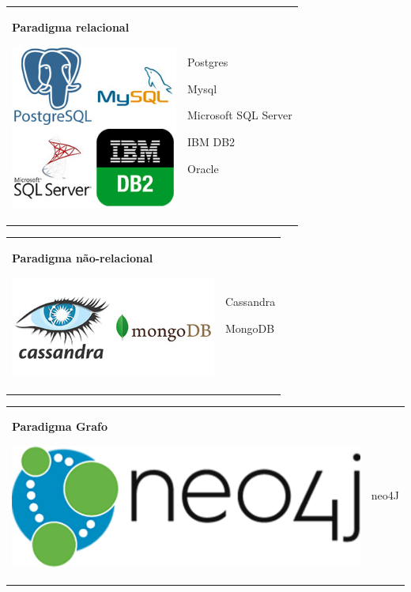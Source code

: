 \documentclass[
]{book}
\begin{document}
\begin{longtable}[]{@{}
  >{\raggedright\arraybackslash}p{}
  >{\centering\arraybackslash}p{}@{}}
\toprule\noalign{}
\endhead
\bottomrule\noalign{}
\endlastfoot
\textbf{Paradigma relacional}

\includegraphics[width=2.16667in,height=\textheight]{images/clipboard-3269919173.png} & Postgres

Mysql

Microsoft SQL Server

IBM DB2

Oracle \\
\end{longtable}

\begin{longtable}[]{@{}
  >{\raggedright\arraybackslash}p{}
  >{\centering\arraybackslash}p{}@{}}
\toprule\noalign{}
\endhead
\bottomrule\noalign{}
\endlastfoot
\textbf{Paradigma não-relacional}

\includegraphics{images/clipboard-1618144074.png} & Cassandra

MongoDB \\
\end{longtable}

\begin{longtable}[]{@{}
  >{\raggedright\arraybackslash}p{}
  >{\centering\arraybackslash}p{}@{}}
\toprule\noalign{}
\endhead
\bottomrule\noalign{}
\endlastfoot
\textbf{Paradigma Grafo}

\includegraphics{images/clipboard-2057319963.png} & neo4J \\
\end{longtable}
\end{document}
